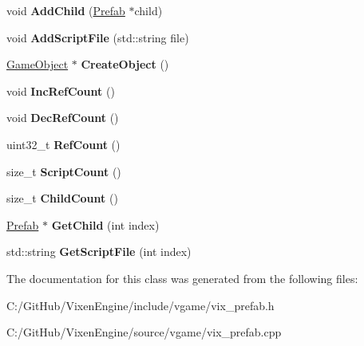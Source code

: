 \begin{DoxyCompactItemize}
\item 
\hypertarget{class_vixen_1_1_prefab_a7a07a5f490e9f4a55b4e8ade5ed67417}{}void {\bfseries Add\+Child} (\hyperlink{class_vixen_1_1_prefab}{Prefab} $\ast$child)\label{class_vixen_1_1_prefab_a7a07a5f490e9f4a55b4e8ade5ed67417}

\item 
\hypertarget{class_vixen_1_1_prefab_acc60551c6491686f8703a5e720b3f994}{}void {\bfseries Add\+Script\+File} (std\+::string file)\label{class_vixen_1_1_prefab_acc60551c6491686f8703a5e720b3f994}

\item 
\hypertarget{class_vixen_1_1_prefab_a9c88ed26d1cc0efd7136afff485d0d29}{}\hyperlink{class_vixen_1_1_game_object}{Game\+Object} $\ast$ {\bfseries Create\+Object} ()\label{class_vixen_1_1_prefab_a9c88ed26d1cc0efd7136afff485d0d29}

\item 
\hypertarget{class_vixen_1_1_prefab_a9b19e07f91c58e2a0d61ec2da21b4370}{}void {\bfseries Inc\+Ref\+Count} ()\label{class_vixen_1_1_prefab_a9b19e07f91c58e2a0d61ec2da21b4370}

\item 
\hypertarget{class_vixen_1_1_prefab_accb917f3a68a5807dac071dd6985e433}{}void {\bfseries Dec\+Ref\+Count} ()\label{class_vixen_1_1_prefab_accb917f3a68a5807dac071dd6985e433}

\item 
\hypertarget{class_vixen_1_1_prefab_adfe15c80db255b1e7ee3c98dde42868a}{}uint32\+\_\+t {\bfseries Ref\+Count} ()\label{class_vixen_1_1_prefab_adfe15c80db255b1e7ee3c98dde42868a}

\item 
\hypertarget{class_vixen_1_1_prefab_a1d6f22b0e94b77b21e7ba2a8c80352f6}{}size\+\_\+t {\bfseries Script\+Count} ()\label{class_vixen_1_1_prefab_a1d6f22b0e94b77b21e7ba2a8c80352f6}

\item 
\hypertarget{class_vixen_1_1_prefab_aa95188d2c36e86c1e7d1fb1d9819e28a}{}size\+\_\+t {\bfseries Child\+Count} ()\label{class_vixen_1_1_prefab_aa95188d2c36e86c1e7d1fb1d9819e28a}

\item 
\hypertarget{class_vixen_1_1_prefab_ab35ff61c56bb896e3d5d5e3282b32b49}{}\hyperlink{class_vixen_1_1_prefab}{Prefab} $\ast$ {\bfseries Get\+Child} (int index)\label{class_vixen_1_1_prefab_ab35ff61c56bb896e3d5d5e3282b32b49}

\item 
\hypertarget{class_vixen_1_1_prefab_a8583bd798899d856fca31a18e9042e75}{}std\+::string {\bfseries Get\+Script\+File} (int index)\label{class_vixen_1_1_prefab_a8583bd798899d856fca31a18e9042e75}

\end{DoxyCompactItemize}


The documentation for this class was generated from the following files\+:\begin{DoxyCompactItemize}
\item 
C\+:/\+Git\+Hub/\+Vixen\+Engine/include/vgame/vix\+\_\+prefab.\+h\item 
C\+:/\+Git\+Hub/\+Vixen\+Engine/source/vgame/vix\+\_\+prefab.\+cpp\end{DoxyCompactItemize}
